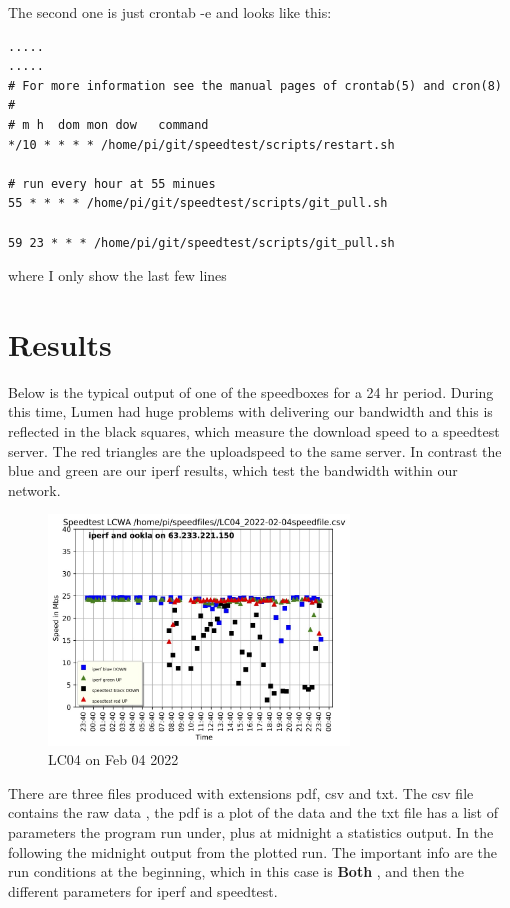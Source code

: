 \documentclass[11pt]{article}
\begin{document}
The second one is just crontab -e and looks like this:
\begin{verbatim}
.....
.....
# For more information see the manual pages of crontab(5) and cron(8)
# 
# m h  dom mon dow   command
*/10 * * * * /home/pi/git/speedtest/scripts/restart.sh

# run every hour at 55 minues
55 * * * * /home/pi/git/speedtest/scripts/git_pull.sh

59 23 * * * /home/pi/git/speedtest/scripts/git_pull.sh

\end{verbatim}

where I only show the last few lines


\section{Results}

Below is the typical output of one of the speedboxes for a 24 hr period. During this time, Lumen had huge problems with delivering our bandwidth and this is reflected in the black squares, which measure the download speed to a speedtest server. The red triangles are the uploadspeed to the same server. In contrast the blue and green are our iperf results, which test the bandwidth within our network.


\begin{figure}[H]%
  \centering
  \includegraphics[width=8cm]{LC04_2022-02-04speedfile.jpg}
  \caption{LC04 on Feb 04 2022}
  \label{fig:LC04}
\end{figure}

There are three files produced with extensions pdf, csv and txt. The csv file contains the raw data , the pdf is a plot of the data and the txt file has a list of parameters the program run under, plus at midnight a statistics output.
In the following the midnight output from the plotted run. The important info are the run conditions at the beginning, which in this case is \textbf{Both} , and then the different parameters for iperf and speedtest.
\end{document}
